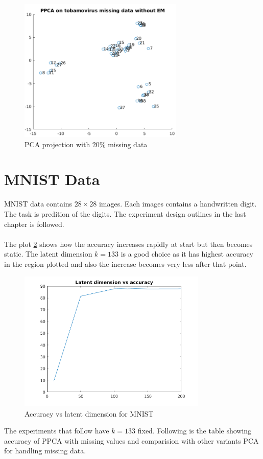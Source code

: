 \begin{figure}
\centering
  	\includegraphics[width=0.7\textwidth]{./images/PCAMiss.png}
  	\caption{PCA projection with 20\% missing data}
  	\label{T5}
\end{figure}

\newpage

\section{MNIST Data}

MNIST data contains $28\times 28$ images. Each images contains a handwritten digit. The task is predition of the digits. The experiment design outlines in the last chapter is followed. \\\\
The plot \ref{T6} shows how the accuracy increases rapidly at start but then becomes static. The latent dimension $k=133$ is a good choice as it has highest accuracy in the region plotted and also the increase becomes very less after that point.\\

\begin{figure}
\centering
  	\includegraphics[width=0.8\textwidth]{./images/accuracy.png}
  	\caption{Accuracy vs latent dimension for MNIST}
  	\label{T6}
\end{figure}
The experiments that follow have $k = 133$ fixed. Following is the table showing accuracy of PPCA with missing values and comparision with other variants PCA for handling missing data. 

